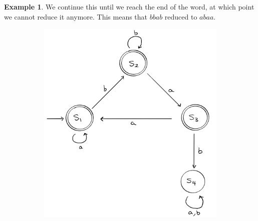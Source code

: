 \documentclass[10pt]{article}
\theoremstyle{plain}
\theoremstyle{definition}
\newtheorem{example}[theorem]{Example}
\theoremstyle{definition}
\theoremstyle{definition}
\begin{document}
\begin{multicols}{2}
\begin{example}
	We continue this until we reach the end of the word, at which point we cannot reduce it anymore. This means that $bbab$ reduced to $abaa$.

	\begin{figure}[t]
		\centering

		\begin{subfigure}{.5\textwidth}
			\includegraphics[scale = 0.2]{Word Acceptor.png}
			

\end{subfigure}
\end{figure}
\end{example}
\end{multicols}
\end{document}
